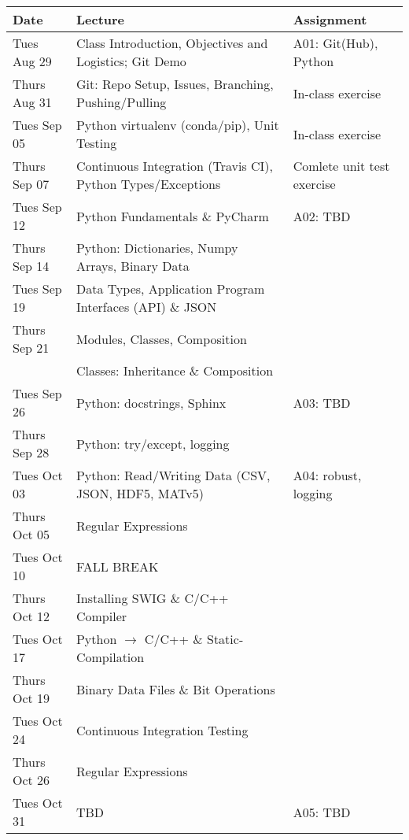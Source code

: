 \begin{longtable}[c]{|l|l|l|}

    \hline 
    
    \textbf{Date} & \textbf{Lecture} & \textbf{Assignment}\\

    \hline

    Tues Aug 29     & Class Introduction, Objectives and Logistics; Git Demo & A01: Git(Hub), Python\\
    Thurs Aug 31    & Git: Repo Setup, Issues, Branching, Pushing/Pulling & In-class exercise\\
    \hline
    Tues Sep 05     & Python virtualenv (conda/pip), Unit Testing & In-class exercise\\
    Thurs Sep 07    & Continuous Integration (Travis CI), Python Types/Exceptions & Comlete unit test exercise\\
    \hline
    Tues Sep 12     & Python Fundamentals \& PyCharm & A02: TBD \\
    Thurs Sep 14    & Python: Dictionaries, Numpy Arrays, Binary Data & \\
    \hline
    Tues Sep 19     & Data Types, Application Program Interfaces (API) \& JSON & \\
    Thurs Sep 21    & Modules, Classes, Composition& \\
                    & Classes: Inheritance \& Composition & \\
    \hline
    Tues Sep 26     & Python: docstrings, Sphinx & A03: TBD\\
    Thurs Sep 28    & Python: try/except, logging & \\
    \hline
    Tues Oct 03     & Python: Read/Writing Data (CSV, JSON, HDF5, MATv5) & A04: robust, logging \\
    Thurs Oct 05    & Regular Expressions & \\
    \hline
    Tues Oct 10     & FALL BREAK & \\
    Thurs Oct 12    & Installing SWIG \& C/C++ Compiler & \\
    \hline
    Tues Oct 17     & Python $\rightarrow$ C/C++ \& Static-Compilation & \\
    Thurs Oct 19    & Binary Data Files \& Bit Operations & \\
    \hline
    Tues Oct 24     & Continuous Integration Testing & \\
    Thurs Oct 26    & Regular Expressions & \\
    \hline
    Tues Oct 31     & TBD & A05: TBD \\

\end{longtable}
